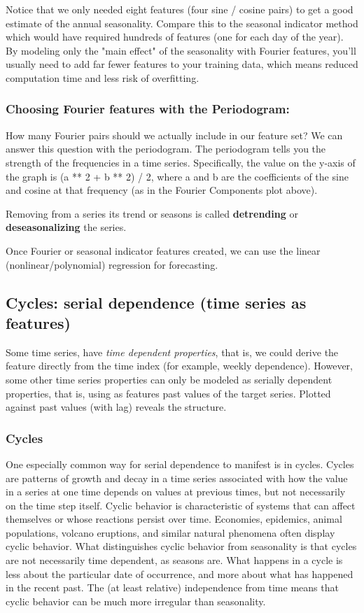 \documentclass[12pt]{report}
\begin{document}
Notice that we only needed eight features (four sine / cosine pairs) to get a good estimate of the annual seasonality. Compare this to the seasonal indicator method which would have required hundreds of features (one for each day of the year). By modeling only the "main effect" of the seasonality with Fourier features, you'll usually need to add far fewer features to your training data, which means reduced computation time and less risk of overfitting.

\subsubsection{Choosing Fourier features with the Periodogram:}

How many Fourier pairs should we actually include in our feature set? We can answer this question with the periodogram. The periodogram tells you the strength of the frequencies in a time series. Specifically, the value on the y-axis of the graph is (a ** 2 + b ** 2) / 2, where a and b are the coefficients of the sine and cosine at that frequency (as in the Fourier Components plot above).

Removing from a series its trend or seasons is called \textbf{detrending} or \textbf{deseasonalizing} the series.

Once Fourier or seasonal indicator features created, we can use the linear (nonlinear/polynomial) regression for forecasting.


\subsection{Cycles: serial dependence (time series as features)}
Some time series, have \textit{time dependent properties}, that is, we could derive the feature directly from the time index (for example, weekly dependence). However, some other time series properties can only be modeled as serially dependent properties, that is, using as features past values of the target series. Plotted against past values (with lag) reveals the structure.

\subsubsection{Cycles} One especially common way for serial dependence to manifest is in cycles. Cycles are patterns of growth and decay in a time series associated with how the value in a series at one time depends on values at previous times, but not necessarily on the time step itself. Cyclic behavior is characteristic of systems that can affect themselves or whose reactions persist over time. Economies, epidemics, animal populations, volcano eruptions, and similar natural phenomena often display cyclic behavior. What distinguishes cyclic behavior from seasonality is that cycles are not necessarily time dependent, as seasons are. What happens in a cycle is less about the particular date of occurrence, and more about what has happened in the recent past. The (at least relative) independence from time means that cyclic behavior can be much more irregular than seasonality.
\end{document}
